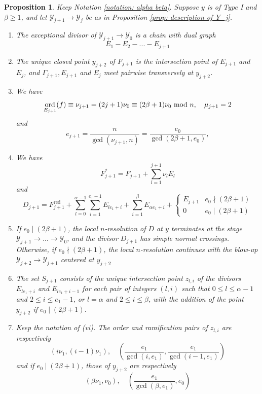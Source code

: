 \documentclass[12pt]{amsart}
\numberwithin{equation}{section}
\newtheorem{prop}[equation]{Proposition}
\theoremstyle{definition}
\newcommand{\Y}{\mathcal{Y}}
\DeclareMathOperator{\red}{red}
\DeclareMathOperator{\ord}{ord}
\begin{document}
\begin{prop}\label{prop: full local resolution for type I}
    Keep Notation \ref{notation: alpha beta}. Suppose $y$ is of Type I and $\beta\geq 1$, and let $\Y_{j+1}\to\Y_j$ be as in Proposition \ref{prop: description of Y_j}.
    \begin{enumerate}[\upshape (i)]
        \item The exceptional divisor of $\Y_{j+1}\to\Y_0$ is a chain with dual graph \[E_1-E_2-...-E_{j+1}\]
        \item The unique closed point $y_{j+2}$ of $F_{j+1}$ is the intersection point of $E_{j+1}$ and $E_j$, and $\Gamma_{j+1},E_{j+1}$ and $E_j$ meet pairwise transversely at $y_{j+2}$.
        \item We have
        \[\ord_{E_{j+1}}(f)\equiv\nu_{j+1}=(2j+1)\nu_0\equiv(2\beta+1)\nu_0\textup{ mod }n,\quad \mu_{j+1}=2\]
        and
        \[e_{j+1}=\frac{n}{\gcd(\nu_{j+1},n)}=\frac{e_0}{\gcd(2\beta+1,e_0)},\]
        \item We have \[F_{j+1}^*=F_{j+1}+\sum_{l=1}^{j+1}\nu_l E_l\]  and
        \[D_{j+1}=F_{j+1}^{\red}+\sum_{l=0}^{\alpha-1}\sum_{i=1}^{e_1-1} E_{le_1+i}+\sum_{i=1}^\beta E_{\alpha e_1+i}+\begin{cases}
           E_{j+1} &e_0\nmid(2\beta+1)\\
           0 &e_0\mid(2\beta+1)
        \end{cases}\]
        \item If $e_0\mid(2\beta+1)$, the local $n$-resolution of $D$ at $y$ terminates at the stage $\Y_{j+1}\to...\to\Y_0$, and the divisor $D_{j+1}$ has simple normal crossings. Otherwise, if $e_0\nmid(2\beta+1)$, the local $n$-resolution continues with the blow-up $\Y_{j+2}\to\Y_{j+1}$ centered at $y_{j+2}$
        \item The set $S_{j+1}$ consists of the unique intersection point $z_{l,i}$ of the divisors $E_{le_1+i}$ and $E_{le_1+i-1}$ for each pair of integers $(l,i)$ such that $0\leq l\leq\alpha-1$ and $2\leq i\leq e_1-1$, or $l=\alpha$ and $2\leq i\leq \beta$, with the addition of the point $y_{j+2}$ if $e_0\mid (2\beta+1)$.
        \item Keep the notation of \textup{(vi)}.
        The order and ramification pairs of $z_{l,i}$ are respectively \[(i\nu_1,(i-1)\nu_1),\quad(\frac{e_1}{\gcd(i,e_1)},\frac{e_1}{\gcd(i-1,e_1)})\]
        and if $e_0\mid(2\beta+1)$, those of $y_{j+2}$ are respectively \[(\beta\nu_1,\nu_0),\quad(\frac{e_1}{\gcd(\beta,e_1)},e_0)\]
    \end{enumerate}
\end{prop}
\end{document}
